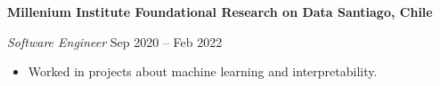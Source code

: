 \documentclass[../main.tex]{subfiles}
\begin{document}
    \textbf{Millenium Institute Foundational Research on Data \hfill  Santiago, Chile} \par
    \textit{Software Engineer} \hfill Sep 2020 -- Feb 2022 \par
    \begin{itemize}
        \item Worked in projects about machine learning and interpretability.
\end{itemize} \par
\end{document}
